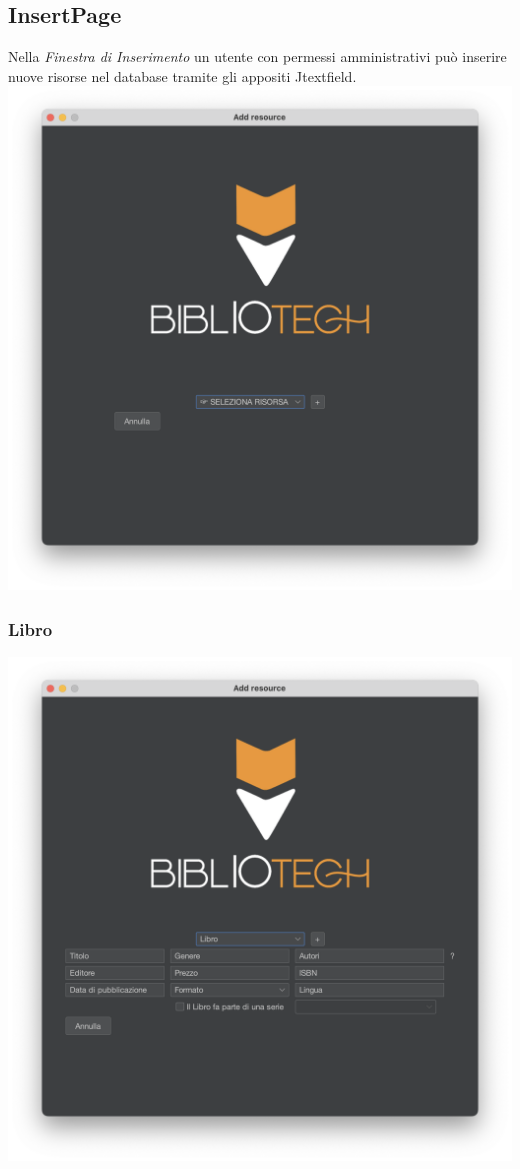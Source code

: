  \subsection{InsertPage}
 Nella \textit{Finestra di Inserimento} un utente con permessi amministrativi può inserire nuove risorse nel database tramite gli
 appositi Jtextfield.
 \\
 \includegraphics[scale=0.25, center]{Immagini/Schermate/Insert/InserisciRisorsaPage.png}

 \subsubsection{Libro}
 \includegraphics[scale=0.25, center]{Immagini/Schermate/Insert/InserisciRisorsaPage-Libro.png}
